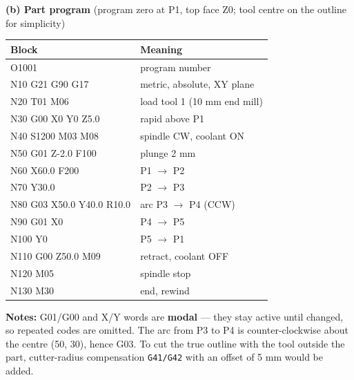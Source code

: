 \documentclass[11pt,a4paper]{article}
\begin{document}
\begin{enumerate}
\begin{answer}
\begin{minipage}[t]{0.55\linewidth}
				\textbf{(b) Part program} (program zero at P1, top face Z0; tool centre on the outline for simplicity)
				\begin{center}
					\footnotesize
					\setlength{\tabcolsep}{3pt}
					\begin{tabular}{@{}>{\ttfamily}l>{\scriptsize}l@{}}
						\toprule
						\textrm{\textbf{Block}} & \textbf{Meaning} \\
						\midrule
						O1001                 & program number \\
						N10 G21 G90 G17       & metric, absolute, XY plane \\
						N20 T01 M06           & load tool 1 (10 mm end mill) \\
						N30 G00 X0 Y0 Z5.0    & rapid above P1 \\
						N40 S1200 M03 M08     & spindle CW, coolant ON \\
						N50 G01 Z-2.0 F100    & plunge 2 mm \\
						N60 X60.0 F200        & P1 $\rightarrow$ P2 \\
						N70 Y30.0             & P2 $\rightarrow$ P3 \\
						N80 G03 X50.0 Y40.0 R10.0 & arc P3 $\rightarrow$ P4 (CCW) \\
						N90 G01 X0            & P4 $\rightarrow$ P5 \\
						N100 Y0               & P5 $\rightarrow$ P1 \\
						N110 G00 Z50.0 M09    & retract, coolant OFF \\
						N120 M05              & spindle stop \\
						N130 M30              & end, rewind \\
						\bottomrule
					\end{tabular}
				\end{center}
			\end{minipage}

			\medskip
			\textbf{Notes:} G01/G00 and X/Y words are \textbf{modal} --- they stay active until changed, so repeated codes are omitted. The arc from P3 to P4 is counter-clockwise about the centre (50, 30), hence G03. To cut the true outline with the tool outside the part, cutter-radius compensation \texttt{G41/G42} with an offset of 5 mm would be added.
		\end{answer}


\end{enumerate}
\end{document}
